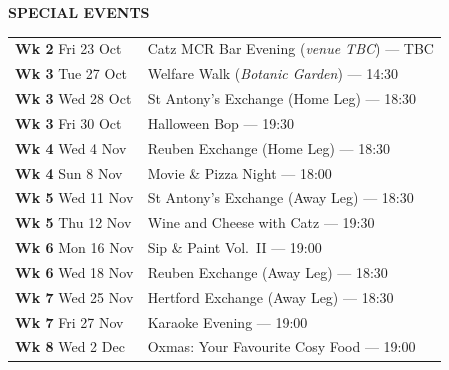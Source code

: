 \documentclass[a4paper,12pt]{article}
\begin{document}
\begin{center}
    {\color{mcrred}\bfseries\Large SPECIAL EVENTS}\\[1.5em]
    \begin{tabular}{@{}p{\colA} >{\raggedleft\arraybackslash}p{\colB}@{}}
      \textbf{Wk 2} \; Fri 23 Oct & Catz MCR Bar Evening (\textit{venue TBC}) --- TBC \\
      \textbf{Wk 3} \; Tue 27 Oct & Welfare Walk (\textit{Botanic Garden}) --- 14:30 \\
      \textbf{Wk 3} \; Wed 28 Oct & St Antony's Exchange (Home Leg) --- 18:30 \\
      \textbf{Wk 3} \; Fri 30 Oct & Halloween Bop --- 19:30 \\
      \textbf{Wk 4} \; Wed 4 Nov  & Reuben Exchange (Home Leg) --- 18:30 \\
      \textbf{Wk 4} \; Sun 8 Nov  & Movie \& Pizza Night --- 18:00 \\
      \textbf{Wk 5} \; Wed 11 Nov & St Antony's Exchange (Away Leg) --- 18:30 \\
      \textbf{Wk 5} \; Thu 12 Nov & Wine and Cheese with Catz --- 19:30 \\
      \textbf{Wk 6} \; Mon 16 Nov & Sip \& Paint Vol.~II --- 19:00 \\
      \textbf{Wk 6} \; Wed 18 Nov & Reuben Exchange (Away Leg) --- 18:30 \\
      \textbf{Wk 7} \; Wed 25 Nov & Hertford Exchange (Away Leg) --- 18:30 \\
      \textbf{Wk 7} \; Fri 27 Nov & Karaoke Evening --- 19:00 \\
      \textbf{Wk 8} \; Wed 2 Dec  & Oxmas: Your Favourite Cosy Food --- 19:00 \\
    \end{tabular}

\end{center}
\vspace*{\fill}
\end{document}
